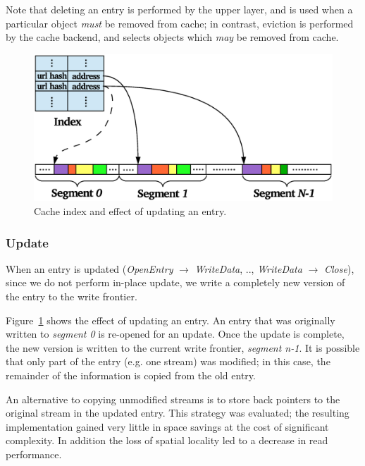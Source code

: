 \documentclass{sig-alternate}
\begin{document}
Note that deleting an entry is performed by the upper layer, and is used when a
particular object \emph{must} be removed from cache; in contrast, eviction is
performed by the cache backend, and selects objects which \emph{may} be removed
from cache.

\begin{figure}[t]
  \begin{center}
    \includegraphics[width=1.04\columnwidth]{graphs/update}
  \end{center}
  \caption{Cache index and effect of updating an entry.}
  \label{fig:update} 
\vspace{-0.2in}
\end{figure}

\subsubsection{Update}
When an entry is updated (\emph{OpenEntry} $\rightarrow$ \emph{WriteData}, ..,
\emph{WriteData} $\rightarrow$ \emph{Close}), since we do not perform in-place
update, we write a completely new version of the entry to the write frontier.

Figure~\ref{fig:update} shows the effect of updating an entry.  An entry that
was originally written to \emph{segment 0} is re-opened for an update.  Once the
update is complete, the new version is written to the current write frontier,
\emph{segment n-1}.  It is possible that only part of the entry (e.g. one
stream) was modified; in this case, the remainder of the information is copied
from the old entry.

An alternative to copying unmodified streams is to store back pointers to the
original stream in the updated entry. This strategy was evaluated; the resulting
implementation gained very little in space savings at the cost of significant
complexity. In addition the loss of spatial locality led to a decrease in read
performance.
\end{document}
